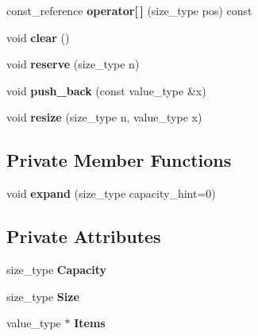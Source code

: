 \begin{DoxyCompactItemize}
\item 
const\+\_\+reference {\bfseries operator\mbox{[}$\,$\mbox{]}} (size\+\_\+type pos) const \hypertarget{class_f_t_vector_a3da21c8d8b89ab5f0ad2d4db5fef89c5}{}\label{class_f_t_vector_a3da21c8d8b89ab5f0ad2d4db5fef89c5}

\item 
void {\bfseries clear} ()\hypertarget{class_f_t_vector_a67f25dc63f17ffa9d7cc12c11175e900}{}\label{class_f_t_vector_a67f25dc63f17ffa9d7cc12c11175e900}

\item 
void {\bfseries reserve} (size\+\_\+type n)\hypertarget{class_f_t_vector_a148e3c1116a60d9c3edd787936e0df27}{}\label{class_f_t_vector_a148e3c1116a60d9c3edd787936e0df27}

\item 
void {\bfseries push\+\_\+back} (const value\+\_\+type \&x)\hypertarget{class_f_t_vector_a791d950e681867166b7afaca20c72722}{}\label{class_f_t_vector_a791d950e681867166b7afaca20c72722}

\item 
void {\bfseries resize} (size\+\_\+type n, value\+\_\+type x)\hypertarget{class_f_t_vector_a44869ccb17027d3880c5b5054c325dba}{}\label{class_f_t_vector_a44869ccb17027d3880c5b5054c325dba}

\end{DoxyCompactItemize}
\subsection*{Private Member Functions}
\begin{DoxyCompactItemize}
\item 
void {\bfseries expand} (size\+\_\+type capacity\+\_\+hint=0)\hypertarget{class_f_t_vector_a67f3d9b4fcba4de708f061e9355f8b97}{}\label{class_f_t_vector_a67f3d9b4fcba4de708f061e9355f8b97}

\end{DoxyCompactItemize}
\subsection*{Private Attributes}
\begin{DoxyCompactItemize}
\item 
size\+\_\+type {\bfseries Capacity}\hypertarget{class_f_t_vector_abf228fec74fd8df00e007707d3c4e2b7}{}\label{class_f_t_vector_abf228fec74fd8df00e007707d3c4e2b7}

\item 
size\+\_\+type {\bfseries Size}\hypertarget{class_f_t_vector_af22bfa6c569bc8ff3a73c9642e02e380}{}\label{class_f_t_vector_af22bfa6c569bc8ff3a73c9642e02e380}

\item 
value\+\_\+type $\ast$ {\bfseries Items}\hypertarget{class_f_t_vector_aedae5cae2c695f091d7ae860f6642937}{}\label{class_f_t_vector_aedae5cae2c695f091d7ae860f6642937}

\end{DoxyCompactItemize}


